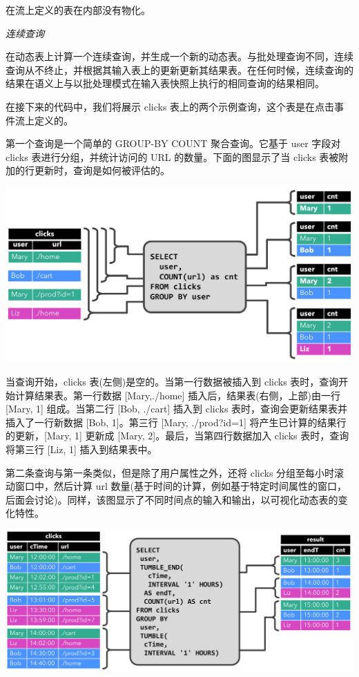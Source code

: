 \documentclass[cn,11pt,chinese]{elegantbook}
\renewenvironment{quote}{\begin{customblockquote}\list{}{\rightmargin=0em\leftmargin=0em}%
\item\relax\color{blockquote-text}\ignorespaces}{\unskip\unskip\endlist\end{customblockquote}}
\begin{document}
\begin{quote}
在流上定义的表在内部没有物化。
\end{quote}

\emph{连续查询}

在动态表上计算一个连续查询，并生成一个新的动态表。与批处理查询不同，连续查询从不终止，并根据其输入表上的更新更新其结果表。在任何时候，连续查询的结果在语义上与以批处理模式在输入表快照上执行的相同查询的结果相同。

在接下来的代码中，我们将展示 clicks
表上的两个示例查询，这个表是在点击事件流上定义的。

第一个查询是一个简单的 GROUP-BY COUNT 聚合查询。它基于 user 字段对
clicks 表进行分组，并统计访问的 URL 的数量。下面的图显示了当 clicks
表被附加的行更新时，查询是如何被评估的。

\includegraphics{images/query-groupBy-cnt.png}

当查询开始，clicks 表(左侧)是空的。当第一行数据被插入到 clicks
表时，查询开始计算结果表。第一行数据 {[}Mary,./home{]}
插入后，结果表(右侧，上部)由一行 {[}Mary, 1{]} 组成。当第二行 {[}Bob,
./cart{]} 插入到 clicks 表时，查询会更新结果表并插入了一行新数据 {[}Bob,
1{]}。第三行 {[}Mary, ./prod?id=1{]}
将产生已计算的结果行的更新，{[}Mary, 1{]} 更新成 {[}Mary,
2{]}。最后，当第四行数据加入 clicks 表时，查询将第三行 {[}Liz, 1{]}
插入到结果表中。

第二条查询与第一条类似，但是除了用户属性之外，还将 clicks
分组至每小时滚动窗口中，然后计算 url
数量(基于时间的计算，例如基于特定时间属性的窗口，后面会讨论)。同样，该图显示了不同时间点的输入和输出，以可视化动态表的变化特性。

\includegraphics{images/query-groupBy-window-cnt.png}
\end{document}
